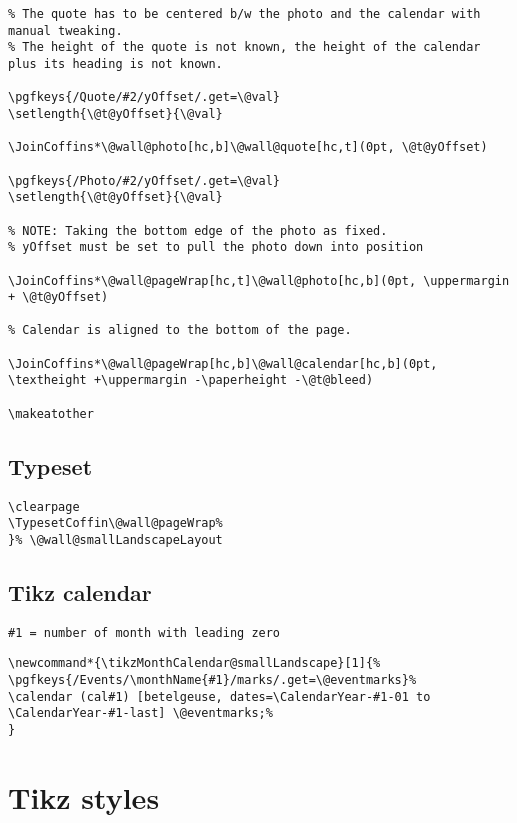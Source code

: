 \documentclass[11pt,oneside]{memoir-article}
\begin{document}
\begin{verbatim}
% The quote has to be centered b/w the photo and the calendar with manual tweaking.
% The height of the quote is not known, the height of the calendar plus its heading is not known.

\pgfkeys{/Quote/#2/yOffset/.get=\@val}
\setlength{\@t@yOffset}{\@val}

\JoinCoffins*\@wall@photo[hc,b]\@wall@quote[hc,t](0pt, \@t@yOffset)

\pgfkeys{/Photo/#2/yOffset/.get=\@val}
\setlength{\@t@yOffset}{\@val}

% NOTE: Taking the bottom edge of the photo as fixed.
% yOffset must be set to pull the photo down into position

\JoinCoffins*\@wall@pageWrap[hc,t]\@wall@photo[hc,b](0pt, \uppermargin + \@t@yOffset)

% Calendar is aligned to the bottom of the page.

\JoinCoffins*\@wall@pageWrap[hc,b]\@wall@calendar[hc,b](0pt, \textheight +\uppermargin -\paperheight -\@t@bleed)

\makeatother
\end{verbatim}

\subsection{Typeset}
\label{sec-10-5-6}

\begin{verbatim}
\clearpage
\TypesetCoffin\@wall@pageWrap%
}% \@wall@smallLandscapeLayout
\end{verbatim}

\subsection{Tikz calendar}
\label{sec-10-5-7}

\begin{verbatim}
#1 = number of month with leading zero
\end{verbatim}

\begin{verbatim}
\newcommand*{\tikzMonthCalendar@smallLandscape}[1]{%
\pgfkeys{/Events/\monthName{#1}/marks/.get=\@eventmarks}%
\calendar (cal#1) [betelgeuse, dates=\CalendarYear-#1-01 to \CalendarYear-#1-last] \@eventmarks;%
}
\end{verbatim}

\section{Tikz styles}
\label{sec-10-6}
\end{document}

